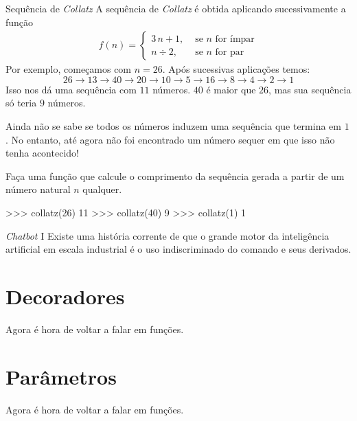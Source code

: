 	\begin{problem}{Sequência de \emph{Collatz}}    
	A sequência de \emph{Collatz} é obtida aplicando sucessivamente a função
	{\large
		\begin{align*}
		f(n) = \begin{cases}
		3\, n + 1, &\text{ se } n \text{ for ímpar}\\
		n \div 2, &\text{ se } n \text{ for par}
		\end{cases}
		\end{align*}
	}
	Por exemplo, começamos com $n = 26$. Após sucessivas aplicações temos:
	$$26 \to 13 \to 40 \to 20 \to 10 \to 5 \to 16 \to 8 \to 4 \to 2 \to 1$$
	Isso nos dá uma sequência com $11$ números. $40$ é maior que $26$, mas sua sequência só teria $9$ números.\par

	Ainda não se sabe se todos os números induzem uma sequência que termina em $1$. No entanto, até agora não foi encontrado um número sequer em que isso não tenha acontecido! \par

	\proposal Faça uma função que calcule o comprimento da sequência gerada a partir de um número natural $n$ qualquer. \par
	
	\begin{lstpython}
	>>> collatz(26)
	11
	>>> collatz(40)
	9
	>>> collatz(1)
	1
	\end{lstpython}
	\end{problem}

	\begin{problem}{\textit{Chatbot} I}
	Existe uma história corrente de que o grande motor da inteligência artificial em escala industrial é o uso indiscriminado do comando  e seus derivados.
	\end{problem}

	\section*{Decoradores}
	Agora é hora de voltar a falar em funções. 

	\section*{Parâmetros}
	Agora é hora de voltar a falar em funções.

\endinput